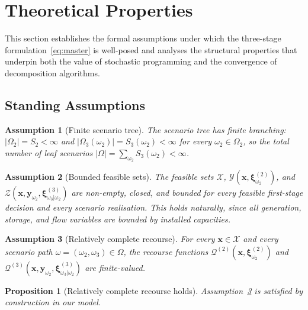 \documentclass[11pt]{article}
\newtheorem{assumption}{Assumption}
\newtheorem{proposition}{Proposition}
\begin{document}
\section{Theoretical Properties}\label{sec:theory}

This section establishes the formal assumptions under which the
three-stage formulation~\eqref{eq:master} is well-posed and analyses
the structural properties that underpin both the value of stochastic
programming and the convergence of decomposition algorithms.

\subsection{Standing Assumptions}\label{sec:assumptions}

\begin{assumption}[Finite scenario tree]\label{as:finite}
The scenario tree has finite branching: $|\Omega_2| = S_2 < \infty$
and $|\Omega_3(\omega_2)| = S_3(\omega_2) < \infty$ for every
$\omega_2 \in \Omega_2$, so the total number of leaf scenarios
$|\Omega| = \sum_{\omega_2} S_3(\omega_2) < \infty$.
\end{assumption}

\begin{assumption}[Bounded feasible sets]\label{as:bounded}
The feasible sets $\mathcal{X}$,
$\mathcal{Y}(\mathbf{x}, \boldsymbol{\xi}^{(2)}_{\omega_2})$, and
$\mathcal{Z}(\mathbf{x}, \mathbf{y}_{\omega_2},
\boldsymbol{\xi}^{(3)}_{\omega_3|\omega_2})$
are non-empty, closed, and bounded for every feasible first-stage
decision and every scenario realisation. This holds naturally, since
all generation, storage, and flow variables are bounded by installed
capacities.
\end{assumption}

\begin{assumption}[Relatively complete recourse]\label{as:rcr}
For every $\mathbf{x} \in \mathcal{X}$ and every scenario path
$\omega = (\omega_2, \omega_3) \in \Omega$, the recourse functions
$\mathcal{Q}^{(2)}(\mathbf{x}, \boldsymbol{\xi}^{(2)}_{\omega_2})$
and
$\mathcal{Q}^{(3)}(\mathbf{x}, \mathbf{y}_{\omega_2},
\boldsymbol{\xi}^{(3)}_{\omega_3|\omega_2})$
are finite-valued.
\end{assumption}

\begin{proposition}[Relatively complete recourse holds]
\label{prop:rcr}
Assumption~\ref{as:rcr} is satisfied by construction in our model.
\end{proposition}
\end{document}
